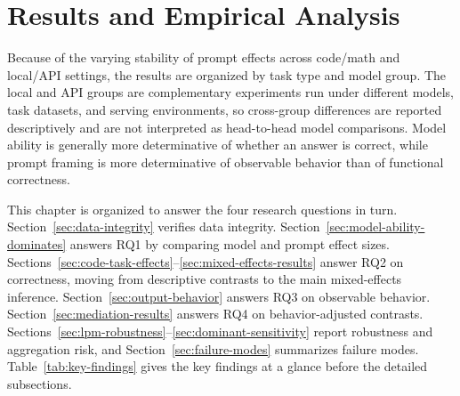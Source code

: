 \chapter{Results and Empirical Analysis\label{cha:chapter5}}

Because of the varying stability of prompt effects across code/math and local/API settings, the results are organized by task type and model group. The local and API groups are complementary experiments run under different models, task datasets, and serving environments, so cross-group differences are reported descriptively and are not interpreted as head-to-head model comparisons. Model ability is generally more determinative of whether an answer is correct, while prompt framing is more determinative of observable behavior than of functional correctness.

This chapter is organized to answer the four research questions in turn. Section~\ref{sec:data-integrity} verifies data integrity. Section~\ref{sec:model-ability-dominates} answers RQ1 by comparing model and prompt effect sizes. Sections~\ref{sec:code-task-effects}--\ref{sec:mixed-effects-results} answer RQ2 on correctness, moving from descriptive contrasts to the main mixed-effects inference. Section~\ref{sec:output-behavior} answers RQ3 on observable behavior. Section~\ref{sec:mediation-results} answers RQ4 on behavior-adjusted contrasts. Sections~\ref{sec:lpm-robustness}--\ref{sec:dominant-sensitivity} report robustness and aggregation risk, and Section~\ref{sec:failure-modes} summarizes failure modes. Table~\ref{tab:key-findings} gives the key findings at a glance before the detailed subsections.

